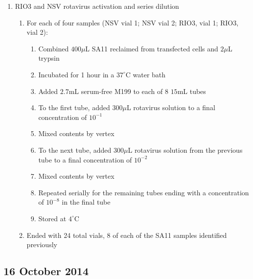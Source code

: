 \begin{enumerate}
	\item RIO3 and NSV rotavirus activation and series dilution
		\begin{enumerate}
			\item For each of four samples (NSV vial 1; NSV vial 2; RIO3, vial 1; RIO3, vial 2):
				\begin{enumerate}
					\item Combined $400\mu$L SA11 reclaimed from transfected cells and $2\mu$L trypsin
					\item Incubated for 1 hour in a $37^{\circ}$C water bath
					\item Added $2.7$mL serum-free M199 to each of 8 $15$mL tubes
					\item To the first tube, added $300\mu$L rotavirus solution to a final concentration of $10^{-1}$
					\item Mixed contents by vertex
					\item To the next tube, added $300\mu$L rotavirus solution from the previous tube to a final concentration of $10^{-2}$
					\item Mixed contents by vertex
					\item Repeated serially for the remaining tubes ending with a concentration of $10^{-8}$ in the final tube
					\item Stored at $4^{\circ}$C
				\end{enumerate}
			\item Ended with 24 total vials, 8 of each of the SA11 samples identified previously
		\end{enumerate}
\end{enumerate}

%
% 

\subsection*{16 October 2014}


